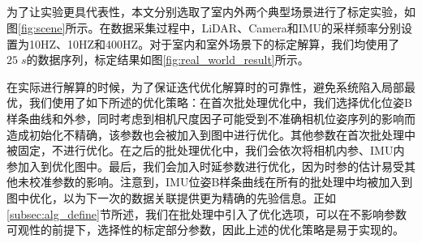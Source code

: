 \subsection{}
为了让实验更具代表性，本文分别选取了室内外两个典型场景进行了标定实验，如图\ref{fig:scene}所示。在数据采集过程中，LiDAR、Camera和IMU的采样频率分别设置为10HZ、10HZ和400HZ。对于室内和室外场景下的标定解算，我们均使用了$25\;s$的数据序列，标定结果如图\ref{fig:real_world_result}所示。

在实际进行解算的时候，为了保证迭代优化解算时的可靠性，避免系统陷入局部最优，我们使用了如下所述的优化策略：在首次批处理优化中，我们选择优化位姿B样条曲线和外参，同时考虑到相机尺度因子可能受到不准确相机位姿序列的影响而造成初始化不精确，该参数也会被加入到图中进行优化。其他参数在首次批处理中被固定，不进行优化。在之后的批处理优化中，我们会依次将相机内参、IMU内参加入到优化图中。最后，我们会加入时延参数进行优化，因为时参的估计易受其他未校准参数的影响。注意到，IMU位姿B样条曲线在所有的批处理中均被加入到图中优化，以为下一次的数据关联提供更为精确的先验信息。正如\ref{subsec:alg_define}节所述，我们在批处理中引入了优化选项，可以在不影响参数可观性的前提下，选择性的标定部分参数，因此上述的优化策略是易于实现的。

